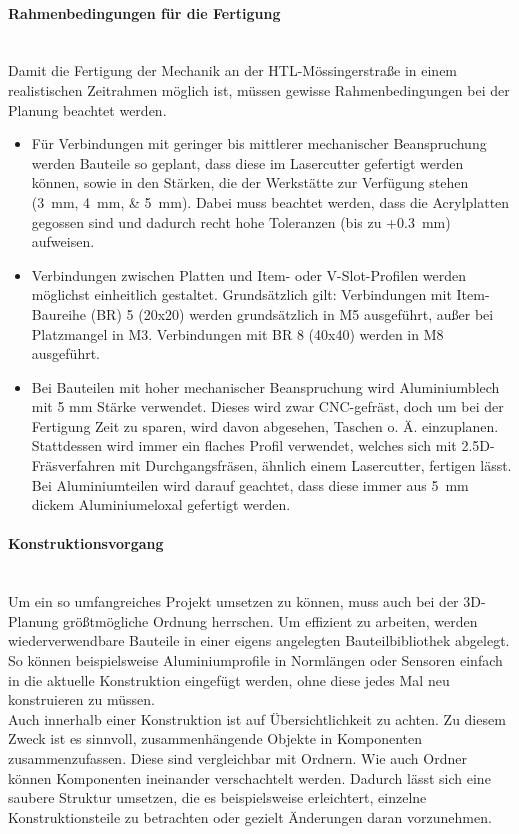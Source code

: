\paragraph{Rahmenbedingungen für die Fertigung}\mbox{}\\
Damit die Fertigung der Mechanik an der HTL-Mössingerstraße in einem realistischen Zeitrahmen möglich ist, müssen gewisse Rahmenbedingungen bei der Planung beachtet werden.
\begin{itemize}
    \item Für Verbindungen mit geringer bis mittlerer mechanischer Beanspruchung werden Bauteile so geplant, dass diese im Lasercutter gefertigt werden können, sowie in den Stärken, die der Werkstätte zur Verfügung stehen (\qtylist{3;4;5}{\milli\meter}). Dabei muss beachtet werden, dass die Acrylplatten gegossen sind und dadurch recht hohe Toleranzen (bis zu +\SI{0.3}{\milli\meter}) aufweisen.
    \item Verbindungen zwischen Platten und Item- oder V-Slot-Profilen werden möglichst einheitlich gestaltet. Grundsätzlich gilt: Verbindungen mit Item-Baureihe (BR) 5 (20x20) werden grundsätzlich in M5 ausgeführt, außer bei Platzmangel in M3. Verbindungen mit BR 8 (40x40) werden in M8 ausgeführt.
    \item Bei Bauteilen mit hoher mechanischer Beanspruchung wird Aluminiumblech mit 5 mm Stärke verwendet. Dieses wird zwar CNC-gefräst, doch um bei der Fertigung Zeit zu sparen, wird davon abgesehen, Taschen o. Ä. einzuplanen. Stattdessen wird immer ein flaches Profil verwendet, welches sich mit 2.5D-Fräsverfahren mit Durchgangsfräsen, ähnlich einem Lasercutter, fertigen lässt. Bei Aluminiumteilen wird darauf geachtet, dass diese immer aus \SI{5}{\mm} dickem Aluminiumeloxal gefertigt werden.
\end{itemize}



\paragraph{Konstruktionsvorgang}\mbox{}\\
Um ein so umfangreiches Projekt umsetzen zu können, muss auch bei der 3D-Planung größtmögliche Ordnung herrschen. Um effizient zu arbeiten, werden wiederverwendbare Bauteile in einer eigens angelegten Bauteilbibliothek abgelegt. So können beispielsweise Aluminiumprofile in Normlängen oder Sensoren einfach in die aktuelle Konstruktion eingefügt werden, ohne diese jedes Mal neu konstruieren zu müssen.
\\
Auch innerhalb einer Konstruktion ist auf Übersichtlichkeit zu achten. Zu diesem Zweck ist es sinnvoll, zusammenhängende Objekte in Komponenten zusammenzufassen. Diese sind vergleichbar mit Ordnern. Wie auch Ordner können Komponenten ineinander verschachtelt werden. Dadurch lässt sich eine saubere Struktur umsetzen, die es beispielsweise erleichtert, einzelne Konstruktionsteile zu betrachten oder gezielt Änderungen daran vorzunehmen.



